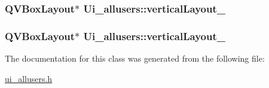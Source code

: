 \hypertarget{classUi__allusers_abd56d2c9a46dba1e21f19295a1fb5ed7}{
\subsubsection[{vertical\-Layout\-\_\-2}]{\setlength{\rightskip}{0pt plus 5cm}Q\-V\-Box\-Layout$\ast$ Ui\-\_\-allusers\-::vertical\-Layout\-\_}}\label{classUi__allusers_abd56d2c9a46dba1e21f19295a1fb5ed7}
\hypertarget{classUi__allusers_ad2a0ec3f0249cd6c6265b7daa7c7e05d}{
\subsubsection[{vertical\-Layout\-\_\-3}]{\setlength{\rightskip}{0pt plus 5cm}Q\-V\-Box\-Layout$\ast$ Ui\-\_\-allusers\-::vertical\-Layout\-\_}}\label{classUi__allusers_ad2a0ec3f0249cd6c6265b7daa7c7e05d}


The documentation for this class was generated from the following file\-:\begin{DoxyCompactItemize}
\item 
\hyperlink{ui__allusers_8h}{ui\-\_\-allusers.\-h}\end{DoxyCompactItemize}
